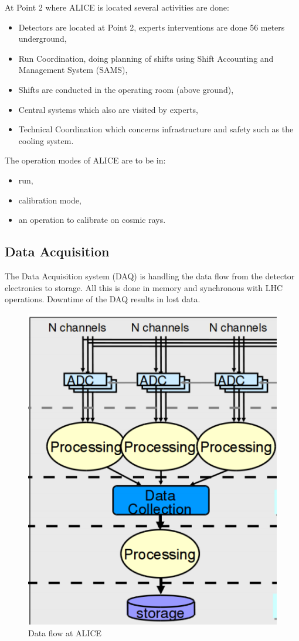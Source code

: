 At Point 2 where ALICE is located several activities are done:
\begin{itemize}
  \item Detectors are located at Point 2, experts interventions are done 56 meters underground,
  \item Run Coordination, doing planning of shifts using Shift Accounting and Management System (SAMS),
  \item Shifts are conducted in the operating room (above ground),
  \item Central systems which also are visited by experts,
  \item Technical Coordination which concerns infrastructure and safety such as the cooling system.
\end{itemize}

The operation modes of ALICE are to be in:
\begin{itemize}
  \item run, 
  \item calibration mode,
  \item an operation to calibrate on cosmic rays.
\end{itemize} 


\subsection{Data Acquisition}
The Data Acquisition system (DAQ) is handling the data flow from the detector electronics to storage. All this is done in memory and synchronous with LHC operations. Downtime of the DAQ results in lost data. 

\begin{figure}
  \begin{center}
    \includegraphics[scale=0.3]{./images/daq.png}
    \caption{Data flow at ALICE}
    \label{fig:}
  \end{center}
\end{figure}

